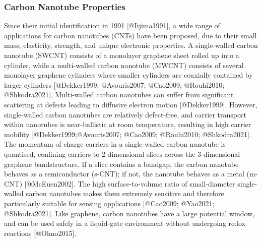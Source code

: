 \documentclass[
  letterpaper,
  DIV=11,
  numbers=noendperiod]{scrartcl}
\begin{document}
\subsubsection{Carbon Nanotube Properties}\label{sec-carbon-nanotubes}

Since their initial identification in 1991 {[}@Iijima1991{]}, a wide
range of applications for carbon nanotubes (CNTs) have been proposed,
due to their small mass, elasticity, strength, and unique electronic
properties. A single-walled carbon nanotube (SWCNT) consists of a
monolayer graphene sheet rolled up into a cylinder, while a multi-walled
carbon nanotube (MWCNT) consists of several monolayer graphene cylinders
where smaller cylinders are coaxially contained by larger cylinders
{[}@Dekker1999; @Avouris2007; @Cao2009; @Rouhi2010; @Shkodra2021{]}.
Multi-walled carbon nanotubes can suffer from significant scattering at
defects leading to diffusive electron motion {[}@Dekker1999{]}. However,
single-walled carbon nanotubes are relatively defect-free, and carrier
transport within nanotubes is near-ballistic at room temperature,
resulting in high carrier mobility {[}@Dekker1999;@Avouris2007;
@Cao2009; @Rouhi2010; @Shkodra2021{]}. The momentum of charge carriers
in a single-walled carbon nanotube is quantised, confining carriers to
2-dimensional slices across the 3-dimensional graphene bandstructure. If
a slice contains a bandgap, the carbon nanotube behaves as a
semiconductor (s-CNT); if not, the nanotube behaves as a metal (m-CNT)
{[}@McEuen2002{]}. The high surface-to-volume ratio of small-diameter
single-walled carbon nanotubes makes them extremely sensitive and
therefore particularly suitable for sensing applications {[}@Cao2009;
@Yao2021; @Shkodra2021{]}. Like graphene, carbon nanotubes have a large
potential window, and can be used safely in a liquid-gate environment
without undergoing redox reactions {[}@Ohno2015{]}.
\end{document}
